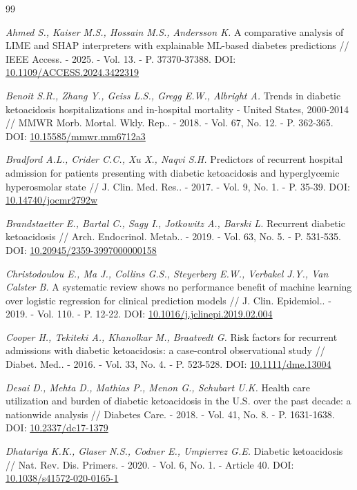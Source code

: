 \documentclass{crm-article}
\begin{document}
\begin{thebibliography}{99}

 \textit{Ahmed S., Kaiser M.S., Hossain M.S., Andersson K.} A comparative analysis of LIME and SHAP interpreters with explainable ML-based diabetes predictions // IEEE Access. - 2025. - Vol. 13. - P. 37370-37388. DOI: \url{10.1109/ACCESS.2024.3422319}

 \textit{Benoit S.R., Zhang Y., Geiss L.S., Gregg E.W., Albright A.} Trends in diabetic ketoacidosis hospitalizations and in-hospital mortality - United States, 2000-2014 // MMWR Morb. Mortal. Wkly. Rep.. - 2018. - Vol. 67, No. 12. - P. 362-365. DOI: \url{10.15585/mmwr.mm6712a3}

 \textit{Bradford A.L., Crider C.C., Xu X., Naqvi S.H.} Predictors of recurrent hospital admission for patients presenting with diabetic ketoacidosis and hyperglycemic hyperosmolar state // J. Clin. Med. Res.. - 2017. - Vol. 9, No. 1. - P. 35-39. DOI: \url{10.14740/jocmr2792w}

 \textit{Brandstaetter E., Bartal C., Sagy I., Jotkowitz A., Barski L.} Recurrent diabetic ketoacidosis // Arch. Endocrinol. Metab.. - 2019. - Vol. 63, No. 5. - P. 531-535. DOI: \url{10.20945/2359-3997000000158}

 \textit{Christodoulou E., Ma J., Collins G.S., Steyerberg E.W., Verbakel J.Y., Van Calster B.} A systematic review shows no performance benefit of machine learning over logistic regression for clinical prediction models // J. Clin. Epidemiol.. - 2019. - Vol. 110. - P. 12-22. DOI: \url{10.1016/j.jclinepi.2019.02.004}

 \textit{Cooper H., Tekiteki A., Khanolkar M., Braatvedt G.} Risk factors for recurrent admissions with diabetic ketoacidosis: a case-control observational study // Diabet. Med.. - 2016. - Vol. 33, No. 4. - P. 523-528. DOI: \url{10.1111/dme.13004}

 \textit{Desai D., Mehta D., Mathias P., Menon G., Schubart U.K.} Health care utilization and burden of diabetic ketoacidosis in the U.S. over the past decade: a nationwide analysis // Diabetes Care. - 2018. - Vol. 41, No. 8. - P. 1631-1638. DOI: \url{10.2337/dc17-1379}

 \textit{Dhatariya K.K., Glaser N.S., Codner E., Umpierrez G.E.} Diabetic ketoacidosis // Nat. Rev. Dis. Primers. - 2020. - Vol. 6, No. 1. - Article 40. DOI: \url{10.1038/s41572-020-0165-1}


\end{thebibliography}
\end{document}

